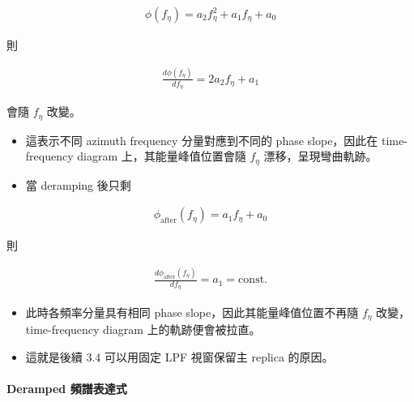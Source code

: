 \documentclass[11pt]{article}
\begin{document}
\begin{equation}
\begin{aligned}
\phi(f_\eta)=a_2 f_\eta^2+a_1 f_\eta+a_0
\end{aligned}
\end{equation}

則

\begin{equation}
\begin{aligned}
\frac{d\phi(f_\eta)}{df_\eta}=2a_2 f_\eta+a_1
\end{aligned}
\end{equation}

會隨 \(f_\eta\) 改變。

\begin{itemize}
\item
  這表示不同 azimuth frequency 分量對應到不同的 phase slope，因此在
  time-frequency diagram 上，其能量峰值位置會隨 \(f_\eta\)
  漂移，呈現彎曲軌跡。
\item
  當 deramping 後只剩
\end{itemize}

\begin{equation}
\begin{aligned}
\phi_{\mathrm{after}}(f_\eta)=a_1 f_\eta+a_0
\end{aligned}
\end{equation}

則

\begin{equation}
\begin{aligned}
\frac{d\phi_{\mathrm{after}}(f_\eta)}{df_\eta}=a_1=\mathrm{const.}
\end{aligned}
\end{equation}

\begin{itemize}
\item
  此時各頻率分量具有相同 phase slope，因此其能量峰值位置不再隨
  \(f_\eta\) 改變，time-frequency diagram 上的軌跡便會被拉直。
\item
  這就是後續 3.4 可以用固定 LPF 視窗保留主 replica 的原因。
\end{itemize}

\hypertarget{deramped-ux983bux8b5cux8868ux9054ux5f0f}{%
\paragraph{Deramped
頻譜表達式}\label{deramped-ux983bux8b5cux8868ux9054ux5f0f}}
\end{document}
